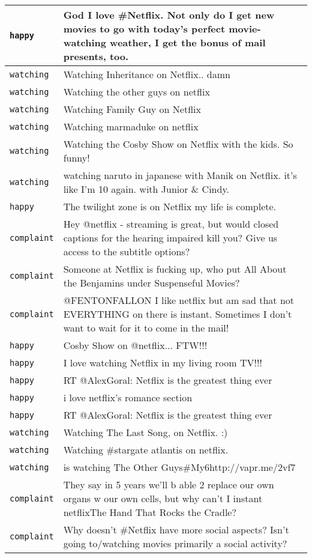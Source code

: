 {\begin{longtable}{|l|p{160mm}|}
         \texttt{happy} & God I love \#Netflix. Not only do I get new movies to go with today's perfect movie-watching weather, I get the bonus of mail presents, too.
      \tabularnewline\hline
         \texttt{watching} & Watching Inheritance on Netflix.. damn
      \tabularnewline\hline
         \texttt{watching} & Watching the other guys on netflix
      \tabularnewline\hline
         \texttt{watching} & Watching Family Guy on Netflix
      \tabularnewline\hline
         \texttt{watching} & Watching marmaduke on netflix
      \tabularnewline\hline
         \texttt{watching} & Watching the Cosby Show on Netflix with the kids. So funny!
      \tabularnewline\hline
         \texttt{watching} & watching naruto in japanese with Manik on Netflix. it's like I'm 10 again. with Junior \& Cindy.
      \tabularnewline\hline
         \texttt{happy} & The twilight zone is on Netflix my life is complete.
      \tabularnewline\hline
         \texttt{complaint} & Hey @netflix - streaming is great, but would closed captions for the hearing impaired kill you? Give us access to the subtitle options?
      \tabularnewline\hline
         \texttt{complaint} & Someone at Netflix is fucking up, who put All About the Benjamins under Suspenseful Movies?
      \tabularnewline\hline
         \texttt{complaint} & @FENTONFALLON I like netflix but am sad that not EVERYTHING on there is instant. Sometimes I don't want to wait for it to come in the mail!
      \tabularnewline\hline
         \texttt{happy} & Cosby Show on @netflix... FTW!!!
      \tabularnewline\hline
         \texttt{happy} & I love watching Netflix in my living room TV!!!
      \tabularnewline\hline
         \texttt{happy} & RT @AlexGoral: Netflix is the greatest thing ever
      \tabularnewline\hline
         \texttt{happy} & i love netflix's romance section
      \tabularnewline\hline
         \texttt{happy} & RT @AlexGoral: Netflix is the greatest thing ever
      \tabularnewline\hline
         \texttt{watching} & Watching The Last Song, on Netflix. :)
      \tabularnewline\hline
         \texttt{watching} & Watching \#stargate atlantis on netflix.
      \tabularnewline\hline
         \texttt{watching} & is watching The Other Guys\#My6http://vapr.me/2vf7
      \tabularnewline\hline
         \texttt{complaint} & They say in 5 years we'll b able 2 replace our own organs w our own cells, but why can't I instant netflixThe Hand That Rocks the Cradle?
      \tabularnewline\hline
         \texttt{complaint} & Why doesn't \#Netflix have more social aspects? Isn't going to/watching movies primarily a social activity?
      \tabularnewline\hline

\end{longtable}}
